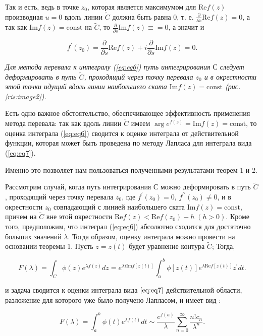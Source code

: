 \documentclass[%
bachelor,    %
natbib,      %
subf,        %
href,        %
colorlinks,  %
]{disser}
\renewcommand{\Re}{\mathrm{Re}}
\renewcommand{\Im}{\mathrm{Im}}
\newcommand{\const}{\mathrm{const}}
\begin{document}
	Так и есть, ведь в точке $z_0$, которая является максимумом для $\Re f (z)$ производная $u=0$ вдоль линии $\widetilde{C}$ должна быть равна 0, т. е. $\frac{\partial}{\partial s}\Re f(z)=0$, а так как $\Im f(z) = \const$ на $\widetilde{C}$, то $\frac{\partial}{\partial s} \Im f(z) \equiv = 0$, а значит и 
	
	$$
	f^\prime(z_0) = \frac{\partial}{\partial s} \Re f(z) + i\frac{\partial}{\partial s} \Im f(z) = 0.
	$$ 
	
	\textit{Для метода перевала к интегралу (\ref{eq:eq6}) путь интегрирования $С$ следует деформировать в путь $\widetilde{C}$, проходящий через точку перевала $z_0$ и в окрестности этой точки идущий вдоль линии наибольшего ската $\Im f(z) = \const$ (рис. \ref{ris:image2}).}
	
	Есть одно важное обстоятельство, обеспечивающее эффективность применения метода перевала: так как вдоль линии $\widetilde{C}$ имеем $\arg e^{f(z)} = \Im f(z) = \const$, то оценка интеграла (\ref{eq:eq6}) сводится к оценке интеграла от действительной функции, которая может быть проведена по методу Лапласа для интеграла вида (\ref{eq:eq7}).  \cite{Fedoryuk}
	
	Именно это позволяет нам пользоваться полученными результатами теорем 1 и 2. 
	
	Рассмотрим  случай, когда путь интегрирования $С$ можно деформировать в путь $\widetilde{C}$, проходящий через точку перевала $z_0$, где $f^\prime(z_0) = 0$, $f^{\prime\prime}(z_0)\neq0$, и в окрестности $z_0$ совпадающий с линией наибольшего ската $\Im f(z) = \const$, причем на $\widetilde{C}$ вне этой окрестности $\Re f(z) < \Re f(z_0) - h \;(h> 0)$. Кроме того, предположим, что интеграл (\ref{eq:eq6}) абсолютно сходится для достаточно больших значений $\lambda$.
	Тогда образом, оценку интеграла можно провести на основании теоремы 1. Пусть $z = z(t)$ будет уравнение контура $\widetilde{C}$; Тогда,
	
	\begin{equation}\label{eq:eq11}
	F(\lambda) = \int_{C}^{}\phi(z) e^{\lambda f(z)}dz=e^{\lambda i \Im f[z(t)]}\int_{a}^{b}\phi[z(t)]e^{\lambda \Re f[z(t)]}z^{\prime} dt.
	\end{equation}
	
	и задача сводится к оценки интеграла вида $\ref{eq:eq7}$ действительной области, разложение для которого уже было получено Лапласом, и имеет вид \cite{Wong}:
	
	$$
	F(\lambda) = \int_{a}^{b}\phi(t)e^{\lambda f(t)}dt \sim \frac{e^{f(a)}}{\lambda}\sum_{n=0}^{\infty}\frac{n! c_n}{\lambda^n}.
	$$
	
\end{document}
